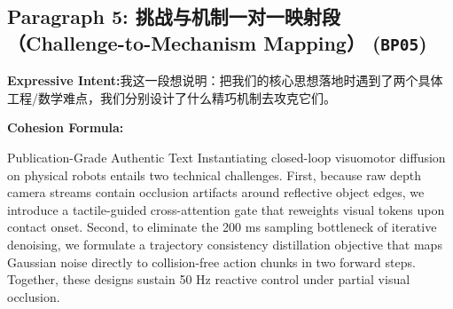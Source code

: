 \subsection*{Paragraph 5: 挑战与机制一对一映射段（Challenge-to-Mechanism Mapping） (\texttt{BP05})}
\noindent\textbf{Expressive Intent:}\enspace 我这一段想说明：把我们的核心思想落地时遇到了两个具体工程/数学难点，我们分别设计了什么精巧机制去攻克它们。\par
\noindent\textbf{Cohesion Formula:}\par\vspace{4pt}
\begin{ExampleBox}{Publication-Grade Authentic Text}
Instantiating closed-loop visuomotor diffusion on physical robots entails two technical challenges. First, because raw depth camera streams contain occlusion artifacts around reflective object edges, we introduce a tactile-guided cross-attention gate that reweights visual tokens upon contact onset. Second, to eliminate the 200 ms sampling bottleneck of iterative denoising, we formulate a trajectory consistency distillation objective that maps Gaussian noise directly to collision-free action chunks in two forward steps. Together, these designs sustain 50 Hz reactive control under partial visual occlusion.
\end{ExampleBox}
